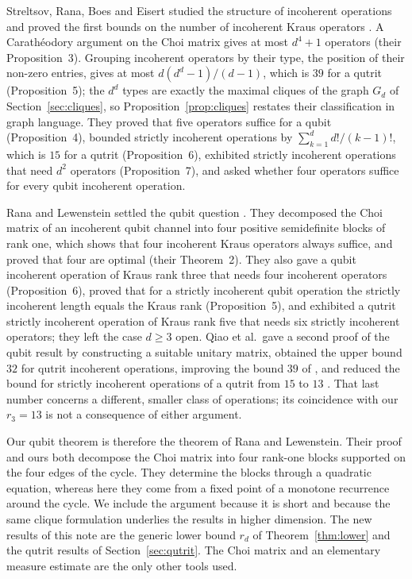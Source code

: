 \documentclass[11pt,a4paper]{article}
\theoremstyle{definition}
\theoremstyle{plain}
\begin{document}
Streltsov, Rana, Boes and Eisert studied the structure of incoherent
operations and proved the first bounds on the number of incoherent Kraus
operators \cite{Streltsov2017PRL}. A Carath\'eodory argument on the Choi
matrix gives at most $d^4+1$ operators (their Proposition~3). Grouping
incoherent operators by their type, the position of their non-zero entries,
gives at most $d(d^d-1)/(d-1)$, which is $39$ for a qutrit (Proposition~5);
the $d^d$ types are exactly the maximal cliques of the graph $G_d$ of
Section~\ref{sec:cliques}, so Proposition~\ref{prop:cliques} restates their
classification in graph language. They proved that five operators suffice
for a qubit (Proposition~4), bounded strictly incoherent operations by
$\sum_{k=1}^dd!/(k-1)!$, which is $15$ for a qutrit (Proposition~6), exhibited
strictly incoherent operations that need $d^2$ operators (Proposition~7), and
asked whether four operators suffice for every qubit incoherent operation.

Rana and Lewenstein settled the qubit question \cite{RanaLewenstein2018}. They
decomposed the Choi matrix of an incoherent qubit channel into four positive
semidefinite blocks of rank one, which shows that four incoherent Kraus
operators always suffice, and proved that four are optimal (their
Theorem~2). They also gave a qubit incoherent operation of Kraus rank three
that needs four incoherent operators (Proposition~6), proved that for a
strictly incoherent qubit operation the strictly incoherent length equals the
Kraus rank (Proposition~5), and exhibited a qutrit strictly incoherent
operation of Kraus rank five that needs six strictly incoherent operators;
they left the case $d\ge3$ open. Qiao et al.\ gave a second proof of the qubit
result by constructing a suitable unitary matrix, obtained the upper bound
$32$ for qutrit incoherent operations, improving the bound $39$ of
\cite{Streltsov2017PRL}, and reduced the bound for strictly incoherent
operations of a qutrit from $15$ to $13$ \cite{Qiao2020}. That last number
concerns a different, smaller class of operations; its coincidence with our
$r_3=13$ is not a consequence of either argument.

Our qubit theorem is therefore the theorem of Rana and Lewenstein. Their
proof and ours both decompose the Choi matrix into four rank-one blocks
supported on the four edges of the cycle. They determine the blocks through a quadratic equation, whereas
here they come from a fixed point of a monotone recurrence around the
cycle. We include the argument because it is short and because the
same clique formulation underlies the results in higher dimension. The new
results of this note are the generic lower bound $r_d$ of
Theorem~\ref{thm:lower} and the qutrit results of Section~\ref{sec:qutrit}.
The Choi matrix \cite{Choi1975} and an elementary measure estimate are the
only other tools used.
\end{document}
